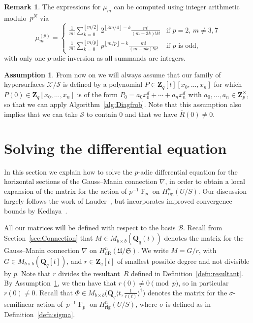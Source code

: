 \documentclass[a4paper,11pt]{article}
\numberwithin{equation}{section}
\providecommand{\floor}[1]{\left\lfloor#1\right\rfloor}   %
\newcommand{\ZZ}{\mathbf{Z}} %
\newcommand{\QQ}{\mathbf{Q}} %
\DeclareMathOperator{\Frob}{F}           %
\providecommand{\HdR}{H_{\text{dR}}}    %
\providecommand{\Hrig}{H_{\text{rig}}}  %
\providecommand{\cB}{\mathcal{B}} %
\theoremstyle{definition}
\newtheorem{rem}[thm]{Remark}
\newtheorem{assump}[thm]{Assumption}
\begin{document}
\begin{rem} \label{rem:mup}
The expressions for $\mu_m$ can be computed using integer arithmetic 
modulo~$p^{\tilde{N}}$ via 
\begin{equation*}
\mu_m^{(p)} = \begin{cases}
\frac{1}{m!} \sum_{k=0}^{\floor{m/2}} 2^{\floor{3m/4} - k} \frac{m!}{(m-2k)! k!}
    & \text{if $p = 2$, $m \neq 3, 7$} \\
\frac{1}{m!} \sum_{k=0}^{\floor{m/p}} p^{\floor{m/p} - k} \frac{m!}{(m-pk)! k!}
    & \text{if $p$ is odd},
\end{cases}
\end{equation*}
with only one $p$-adic inversion as all summands are integers. 
\end{rem}

\begin{assump} \label{assump:diag}
From now on we will always assume that our family of 
hypersurfaces $\mathcal{X}/\mathcal{S}$ is defined by a 
polynomial $P \in \ZZ_q[t][x_0,\ldots,x_n]$ for which 
$P(0) \in \ZZ_q[x_0,\ldots,x_n]$ is of the form 
$P_0=a_0 x_0^d + \dotsb + a_n x_n^d$ with $a_0,\dotsc,a_n \in \ZZ_p^{\times}$, 
so that we can apply Algorithm~\ref{alg:Diagfrob}. Note that this assumption 
also implies that we can take $\mathcal{S}$ to contain $0$ and that we have 
$\overline{R}(0) \neq 0$.
\end{assump}


\section{Solving the differential equation}
\label{sec:DifferentialSystem}

In this section we explain how to solve the $p$-adic differential 
equation for the horizontal sections of the Gauss--Manin 
connection $\nabla$, in order to obtain a local expansion of the 
matrix for the action of $p^{-1} \Frob_p$ on $\Hrig^{n}(U/S)$.  
Our discussion largely follows the work of Lauder~\citep{Lauder2006}, 
but incorporates improved convergence bounds by Kedlaya~\citep{Kedlaya2010}.

All our matrices will be defined with respect to the basis $\cB$. Recall 
from Section~\ref{sec:Connection} that $M \in M_{b \times b}(\QQ_q(t))$ 
denotes the matrix for the Gauss--Manin connection $\nabla$ on 
$\HdR^n(\mathfrak{U}/\mathfrak{S})$. We write $M = G/r$, with 
$G \in M_{b \times b}(\QQ_q[t])$, and $r \in \ZZ_q[t]$ of smallest possible 
degree and not divisible by $p$. Note that $r$ divides the resultant~$R$ 
defined in Definition~\ref{defn:resultant}. By Assumption~\ref{assump:diag}, 
we then have that $r(0) \neq 0 \pmod{p}$, so in particular $r(0) \neq 0$. 
Recall that 
$\Phi \in M_{b \times b} \bigl(\QQ_q \langle t, \frac{1}{r(t)} \rangle^{\dag} \bigr)$ 
denotes the matrix for the $\sigma$-semilinear action of~$p^{-1} \Frob_p$ 
on $\Hrig^{n}(U/S)$, where $\sigma$ is defined as in Definition~\ref{defn:sigma}. 
\end{document}
